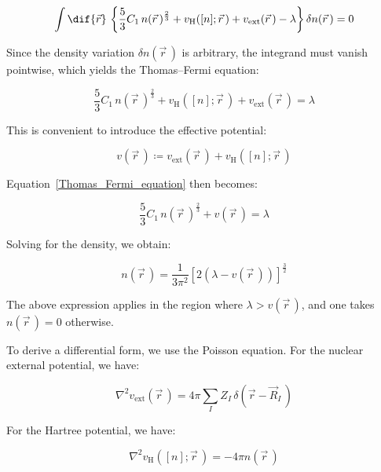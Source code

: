 \begin{equation}
    \int\dif{\vec{r}}\,\left\{\frac{5}{3}C_1\,n(\vec{r}\,)^{\frac{2}{3}}+v_\mathrm{H}([n];\vec{r}\,)+v_\mathrm{ext}(\vec{r}\,)-\lambda\right\}\delta n(\vec{r}\,)=0
\label{total_energy_minimization}
\end{equation}

Since the density variation $\delta n(\vec{r}\,)$ is arbitrary, the integrand must vanish pointwise, which yields the Thomas--Fermi equation:

\begin{equation}
    \frac{5}{3}C_1\,n(\vec{r}\,)^{\frac{2}{3}}+v_\mathrm{H}([n];\vec{r}\,)+v_\mathrm{ext}(\vec{r}\,)=\lambda
\label{Thomas_Fermi_equation}
\end{equation}

This is convenient to introduce the effective potential:

\begin{equation}
    v(\vec{r}\,)\coloneqq v_\mathrm{ext}(\vec{r}\,)+v_\mathrm{H}([n];\vec{r}\,)
\label{effective_potential_definition}
\end{equation}

Equation~\eqref{Thomas_Fermi_equation} then becomes:

\begin{equation}
    \frac{5}{3}C_1\,n(\vec{r}\,)^{\frac{2}{3}}+v(\vec{r}\,)=\lambda
\label{Thomas_Fermi_equation_compact}
\end{equation}

Solving for the density, we obtain:

\begin{equation}
    n(\vec{r}\,)=\frac{1}{3\pi^2}\left[2\left(\lambda-v(\vec{r}\,)\right)\right]^{\frac{3}{2}}
\label{density_TF_from_potential}
\end{equation}

The above expression applies in the region where $\lambda>v(\vec{r}\,)$, and one takes $n(\vec{r}\,)=0$ otherwise.

To derive a differential form, we use the Poisson equation.
For the nuclear external potential, we have:

\begin{equation}
    \nabla^2 v_\mathrm{ext}(\vec{r}\,)=4\pi\sum_I Z_I\,\delta\left(\vec{r}-\vec{R}_I\,\right)
\label{Poisson_external_potential}
\end{equation}

For the Hartree potential, we have:

\begin{equation}
    \nabla^2 v_\mathrm{H}([n];\vec{r}\,)=-4\pi n(\vec{r}\,)
\label{Poisson_Hartree_potential}
\end{equation}

